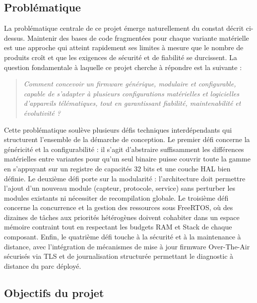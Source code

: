 \subsection{Problématique}
\label{subsec:problematique}

La problématique centrale de ce projet émerge naturellement du constat
décrit ci-dessus. Maintenir des bases de code fragmentées pour chaque
variante matérielle est une approche qui atteint rapidement ses limites
à mesure que le nombre de produits croît et que les exigences de
sécurité et de fiabilité se durcissent. La question fondamentale à
laquelle ce projet cherche à répondre est la suivante :

\begin{quote}
\textit{Comment concevoir un firmware générique, modulaire et
configurable, capable de s'adapter à plusieurs configurations
matérielles et logicielles d'appareils télématiques, tout en
garantissant fiabilité, maintenabilité et évolutivité ?}
\end{quote}

Cette problématique soulève plusieurs défis techniques interdépendants
qui structurent l'ensemble de la démarche de conception. Le premier
défi concerne la généricité et la configurabilité : il s'agit
d'abstraire suffisamment les différences matérielles entre variantes
pour qu'un seul binaire puisse couvrir toute la gamme en s'appuyant
sur un registre de capacités 32 bits et une couche HAL bien définie.
Le deuxième défi porte sur la modularité : l'architecture doit
permettre l'ajout d'un nouveau module (capteur, protocole, service)
sans perturber les modules existants ni nécessiter de recompilation
globale. Le troisième défi concerne la concurrence et la gestion des
ressources sous FreeRTOS, où des dizaines de tâches aux priorités
hétérogènes doivent cohabiter dans un espace mémoire contraint tout
en respectant les budgets RAM et Stack de chaque composant. Enfin,
le quatrième défi touche à la sécurité et à la maintenance à distance,
avec l'intégration de mécanismes de mise à jour firmware Over-The-Air
sécurisés via TLS et de journalisation structurée permettant le
diagnostic à distance du parc déployé.

\subsection{Objectifs du projet}
\label{subsec:objectifs}

